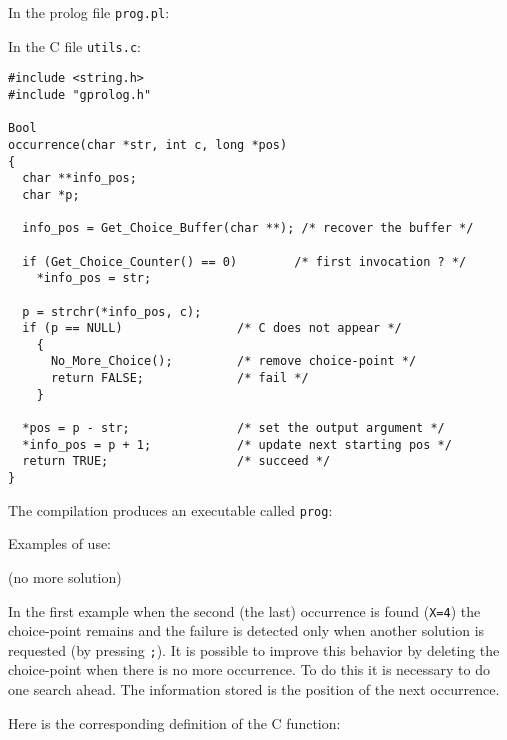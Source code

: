 In the prolog file \texttt{prog.pl}:


In the C file \texttt{utils.c}:

\begin{Indentation}
\begin{verbatim}
#include <string.h>
#include "gprolog.h"

Bool
occurrence(char *str, int c, long *pos)
{
  char **info_pos;
  char *p;

  info_pos = Get_Choice_Buffer(char **); /* recover the buffer */

  if (Get_Choice_Counter() == 0)        /* first invocation ? */
    *info_pos = str;

  p = strchr(*info_pos, c);
  if (p == NULL)                /* C does not appear */
    {
      No_More_Choice();         /* remove choice-point */
      return FALSE;             /* fail */
    }

  *pos = p - str;               /* set the output argument */
  *info_pos = p + 1;            /* update next starting pos */
  return TRUE;                  /* succeed */
}
\end{verbatim}
\end{Indentation}

The compilation produces an executable called \texttt{prog}:


Examples of use:


\begin{CodeTwoCols}
\SkipLine
{}
\SkipLine
{}
\SkipLine
{}     {(no more solution)}
\SkipLine
{}
\SkipLine
{}
\end{CodeTwoCols}

In the first example when the second (the last) occurrence is found
(\texttt{X=4}) the choice-point remains and the failure is detected only
when another solution is requested (by pressing \texttt{;}). It is possible
to improve this behavior by deleting the choice-point when there is no more
occurrence. To do this it is necessary to do one search ahead. The
information stored is the position of the next occurrence.

Here is the corresponding definition of the C function:

